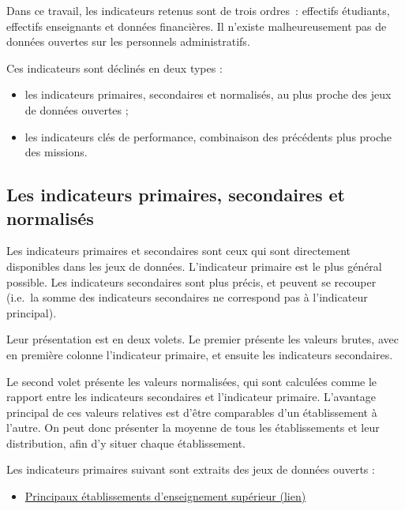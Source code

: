 \documentclass[11pt,french,landscape]{article}
\providecommand{\tightlist}{%
  \setlength{\itemsep}{0pt}\setlength{\parskip}{0pt}}
\begin{document}
\begin{multicols}{2}
Dans ce travail, les indicateurs retenus sont de trois ordres~:
effectifs étudiants, effectifs enseignants et données financières. Il
n'existe malheureusement pas de données ouvertes sur les personnels
administratifs.

Ces indicateurs sont déclinés en deux types :

\begin{itemize}
\tightlist
\item
  les indicateurs primaires, secondaires et normalisés, au plus proche
  des jeux de données ouvertes ;
\item
  les indicateurs clés de performance, combinaison des précédents plus
  proche des missions.
\end{itemize}

\hypertarget{les-indicateurs-primaires-secondaires-et-normalisuxe9s}{%
\subsection{Les indicateurs primaires, secondaires et
normalisés}\label{les-indicateurs-primaires-secondaires-et-normalisuxe9s}}

Les indicateurs primaires et secondaires sont ceux qui sont directement
disponibles dans les jeux de données. L'indicateur primaire est le plus
général possible. Les indicateurs secondaires sont plus précis, et
peuvent se recouper (i.e.~la somme des indicateurs secondaires ne
correspond pas à l'indicateur principal).

Leur présentation est en deux volets. Le premier présente les valeurs
brutes, avec en première colonne l'indicateur primaire, et ensuite les
indicateurs secondaires.

Le second volet présente les valeurs normalisées, qui sont calculées
comme le rapport entre les indicateurs secondaires et l'indicateur
primaire. L'avantage principal de ces valeurs relatives est d'être
comparables d'un établissement à l'autre. On peut donc présenter la
moyenne de tous les établissements et leur distribution, afin d'y situer
chaque établissement.

Les indicateurs primaires suivant sont extraits des jeux de données
ouverts :

\begin{itemize}
\tightlist
\item
  \href{https://data.enseignementsup-recherche.gouv.fr/explore/dataset/fr-esr-principaux-etablissements-enseignement-superieur/}{Principaux
  établissements d'enseignement supérieur (lien)}


\end{itemize}
\end{multicols}
\end{document}
